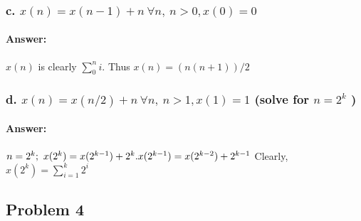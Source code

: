 \documentclass{article}
\begin{document}
    \subsubsection{c. $x(n) = x(n-1) + n \ \forall{n}, \ n > 0, x(0) = 0$}
      \paragraph{Answer: }
        $x(n)$ is clearly $\sum\limits_{0}^{n}i$. Thus $x(n) = (n(n+1))/2$
    \subsubsection{d. $x(n) = x(n/2) + n \ \forall{n}, \ n > 1, x(1) = 1$ (solve for $n = 2^k$ )}
      \paragraph{Answer: }
        $ \\ n=2^k; \ x(2^k) = x(2^{k-1}) + 2^k. \\
        x(2^{k-1}) = x(2^{k-2}) + 2^{k-1} \\$
        Clearly, $x(2^k) = \sum\limits_{i=1}^{k}2^i$
  \subsection{Problem 4}
\end{document}
